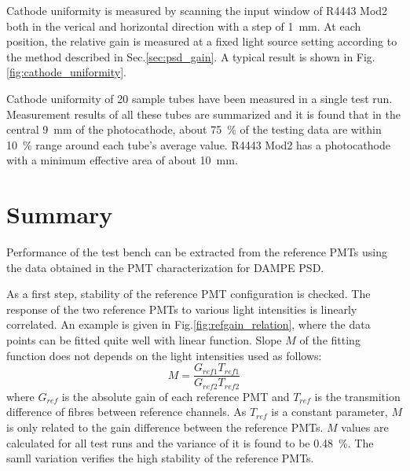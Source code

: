 \documentclass[5p, times]{elsarticle}
\begin{document}

Cathode uniformity is measured by scanning the input window of R4443 Mod2 both in the verical and horizontal direction with a step of \SI{1}{\milli\meter}.
At each position, the relative gain is measured at a fixed light source setting according to the method described in Sec.\ref{sec:psd_gain}.
A typical result is shown in Fig.\ref{fig:cathode_uniformity}.

Cathode uniformity of 20 sample tubes have been measured in a single test run.
Measurement results of all these tubes are summarized and it is found that in the central \SI{9}{\milli\meter} of the photocathode, about \SI{75}{\percent} of the testing data are within \textpm\SI{10}{\percent} range around each tube's average value.
R4443 Mod2 has a photocathode with a minimum effective area of about \SI{10}{\milli\meter}.

\section{Summary}
\label{sec:summary}

Performance of the test bench can be extracted from the reference PMTs using the data obtained in the PMT characterization for DAMPE PSD.

As a first step, stability of the reference PMT configuration is checked.
The response of the two reference PMTs to various light intensities is linearly correlated.
An example is given in Fig.\ref{fig:refgain_relation}, where the data points can be fitted quite well with linear function.
Slope $M$ of the fitting function does not depends on the light intensities used as follows:
\begin{equation}
 M = \frac{G_{ref1} T_{ref1}}{G_{ref2} T_{ref2}}
\end{equation}
where $G_{ref}$ is the absolute gain of each reference PMT and $T_{ref}$ is the transmition difference of fibres between reference channels.
As $T_{ref}$ is a constant parameter, $M$ is only related to the gain difference between the reference PMTs.
$M$ values are calculated for all test runs and the variance of it is found to be \SI{0.48}{\percent}.
The samll variation verifies the high stability of the reference PMTs.
\end{document}
